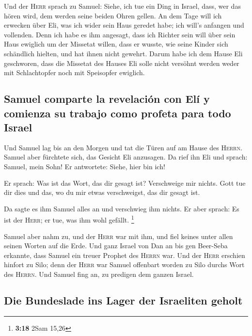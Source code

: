  Und der \textsc{Herr} sprach zu Samuel: Siehe, ich tue
ein Ding in Israel, dass, wer das hören wird, dem werden seine beiden
Ohren gellen.  An dem Tage will ich erwecken über Eli,
was ich wider sein Haus geredet habe; ich will's anfangen und vollenden.
 Denn ich habe es ihm angesagt, dass ich Richter sein
will über sein Haus ewiglich um der Missetat willen, dass er wusste, wie
seine Kinder sich schändlich hielten, und hat ihnen nicht gewehrt.
 Darum habe ich dem Hause Eli geschworen, dass die
Missetat des Hauses Eli solle nicht versöhnt werden weder mit
Schlachtopfer noch mit Speisopfer ewiglich.

\hypertarget{samuel-comparte-la-revelaciuxf3n-con-eluxed-y-comienza-su-trabajo-como-profeta-para-todo-israel}{%
\subsection{Samuel comparte la revelación con Elí y comienza su trabajo
como profeta para todo
Israel}\label{samuel-comparte-la-revelaciuxf3n-con-eluxed-y-comienza-su-trabajo-como-profeta-para-todo-israel}}

 Und Samuel lag bis an den Morgen und tat die Türen auf
am Hause des \textsc{Herrn}. Samuel aber fürchtete sich, das Gesicht Eli
anzusagen.  Da rief ihn Eli und sprach: Samuel, mein
Sohn! Er antwortete: Siehe, hier bin ich!

 Er sprach: Was ist das Wort, das dir gesagt ist?
Verschweige mir nichts. Gott tue dir dies und das, wo du mir etwas
verschweigst, das dir gesagt ist.

 Da sagte es ihm Samuel alles an und verschwieg ihm
nichts. Er aber sprach: Es ist der \textsc{Herr}; er tue, was ihm wohl
gefällt. \footnote{\textbf{3:18} 2Sam 15,26}

 Samuel aber nahm zu, und der \textsc{Herr} war mit ihm,
und fiel keines unter allen seinen Worten auf die Erde. 
Und ganz Israel von Dan an bis gen Beer-Seba erkannte, dass Samuel ein
treuer Prophet des \textsc{Herrn} war.  Und der
\textsc{Herr} erschien hinfort zu Silo; denn der \textsc{Herr} war
Samuel offenbart worden zu Silo durchs Wort des \textsc{Herrn}. Und
Samuel fing an, zu predigen dem ganzen Israel.

\hypertarget{die-bundeslade-ins-lager-der-israeliten-geholt}{%
\subsection{Die Bundeslade ins Lager der Israeliten
geholt}\label{die-bundeslade-ins-lager-der-israeliten-geholt}}


